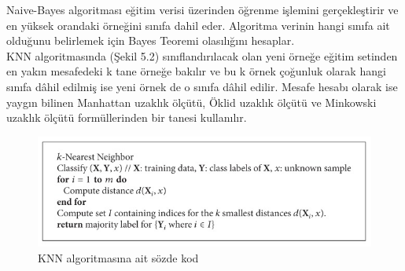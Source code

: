 



Naive-Bayes algoritması eğitim verisi üzerinden öğrenme işlemini gerçekleştirir ve en yüksek orandaki örneğini sınıfa dahil eder. Algoritma verinin hangi sınıfa ait olduğunu belirlemek için Bayes Teoremi olasılığını hesaplar.
\\
KNN algoritmasında (Şekil 5.2) sınıflandırılacak olan yeni örneğe eğitim setinden en yakın mesafedeki k tane örneğe bakılır ve bu k örnek çoğunluk olarak hangi sınıfa dâhil edilmiş ise yeni örnek de o sınıfa dâhil edilir. Mesafe hesabı olarak ise yaygın bilinen  Manhattan uzaklık ölçütü, Öklid uzaklık ölçütü ve Minkowski uzaklık ölçütü formüllerinden bir tanesi kullanılır.
\begin{figure}[!htbp]
\centering
\includegraphics[width=\textwidth]{projectChapters/images/Pseudocode-for-KNN-classification.jpeg}
\caption{KNN algoritmasına ait sözde kod}
\end{figure}

